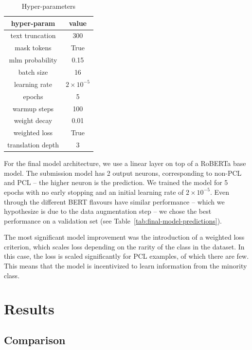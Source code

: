 \documentclass[11pt,a4paper]{article}
\begin{document}
\begin{table}[H]
    \centering
    \begin{tabular}{|c|c|}
        \hline
        hyper-param & value \\
        \hline
        \hline
        text truncation & 300 \\
        mask tokens & True \\
        mlm probability & 0.15 \\
        batch size & 16 \\
        learning rate & $2 \times 10^{-5}$ \\
        epochs & 5 \\
        warmup steps & 100 \\
        weight decay & 0.01 \\
        weighted loss & True \\
        translation depth & 3 \\
        \hline
    \end{tabular}
    \caption{Hyper-parameters}
    \label{tab:hyper-parameters}
\end{table}

For the final model architecture, we use a linear layer on top of a RoBERTa base model. The submission model has 2 output neurons, corresponding to non-PCL and PCL -- the higher neuron is the prediction. We trained the model for 5 epochs with no early stopping and an initial learning rate of $2 \times 10^{-5}$. Even through the different BERT flavours have similar performance -- which we hypothesize is due to the data augmentation step -- we chose the best performance on a validation set (see Table~\ref{tab:final-model-predictions}).

The most significant model improvement was the introduction of a weighted loss criterion, which scales loss depending on the rarity of the class in the dataset. In this case, the loss is scaled significantly for PCL examples, of which there are few. This means that the model is incentivized to learn information from the minority class.

\section{Results}

\subsection{Comparison}
\end{document}
